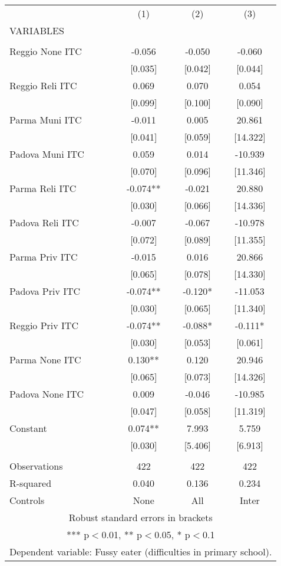 \begin{tabular}{lccc} \hline
 & (1) & (2) & (3) \\
VARIABLES &  &  &  \\ \hline
 &  &  &  \\
Reggio None ITC & -0.056 & -0.050 & -0.060 \\
 & [0.035] & [0.042] & [0.044] \\
Reggio Reli ITC & 0.069 & 0.070 & 0.054 \\
 & [0.099] & [0.100] & [0.090] \\
Parma Muni ITC & -0.011 & 0.005 & 20.861 \\
 & [0.041] & [0.059] & [14.322] \\
Padova Muni ITC & 0.059 & 0.014 & -10.939 \\
 & [0.070] & [0.096] & [11.346] \\
Parma Reli ITC & -0.074** & -0.021 & 20.880 \\
 & [0.030] & [0.066] & [14.336] \\
Padova Reli ITC & -0.007 & -0.067 & -10.978 \\
 & [0.072] & [0.089] & [11.355] \\
Parma Priv ITC & -0.015 & 0.016 & 20.866 \\
 & [0.065] & [0.078] & [14.330] \\
Padova Priv ITC & -0.074** & -0.120* & -11.053 \\
 & [0.030] & [0.065] & [11.340] \\
Reggio Priv ITC & -0.074** & -0.088* & -0.111* \\
 & [0.030] & [0.053] & [0.061] \\
Parma None ITC & 0.130** & 0.120 & 20.946 \\
 & [0.065] & [0.073] & [14.326] \\
Padova None ITC & 0.009 & -0.046 & -10.985 \\
 & [0.047] & [0.058] & [11.319] \\
Constant & 0.074** & 7.993 & 5.759 \\
 & [0.030] & [5.406] & [6.913] \\
 &  &  &  \\
Observations & 422 & 422 & 422 \\
R-squared & 0.040 & 0.136 & 0.234 \\
 Controls & None & All & Inter \\ \hline
\multicolumn{4}{c}{ Robust standard errors in brackets} \\
\multicolumn{4}{c}{ *** p$<$0.01, ** p$<$0.05, * p$<$0.1} \\
\multicolumn{4}{c}{ Dependent variable: Fussy eater (difficulties in primary school).} \\
\end{tabular}
